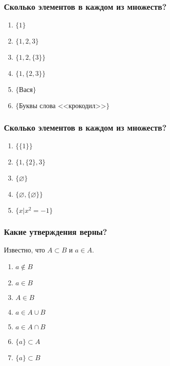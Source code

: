 \begin{frame}
\frametitle{Сколько элементов в каждом из множеств?}

\begin{enumerate}
	\item $\{1\}$\pause
	\item $\{1,2,3\}$\pause
	\item $\{1,2,\{3\}\}$\pause
	\item $\{1,\{2,3\}\}$\pause
	\item $\{Вася\}$\pause
	\item $\{$Буквы слова <<крокодил>>$\}$
	
	
\end{enumerate}

\end{frame}

\begin{frame}
\frametitle{Сколько элементов в каждом из множеств?}

\begin{enumerate}
	\item $\{\{1\}\}$\pause
	\item $\{1,\{2\},3\}$\pause
	\item $\{\varnothing\}$\pause
	\item $\{\varnothing,\{\varnothing\}\}$\pause
	\item $\{x| x^2=-1\}$
	
	
\end{enumerate}

\end{frame}

\begin{frame}
\frametitle{Какие утверждения верны?}

Известно, что $A \subset B$ и $a \in A$.

\begin{enumerate}
	\item $a \notin B$\pause
	\item $a \in B$\pause
	\item $A\in B$\pause
	\item $a \in A \cup B $\pause
	\item $a \in A \cap B$\pause
	\item $\{a\} \subset A$\pause
	\item $\{a\} \subset B$
	
\end{enumerate}

\end{frame}


